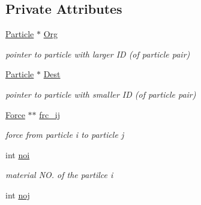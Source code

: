 \subsection*{Private Attributes}
\begin{CompactItemize}
\item 
\hypertarget{classInteraction_b68efe982297a5b6e71ec85e37a60bfb}{
\hyperlink{classParticle}{Particle} $\ast$ \hyperlink{classInteraction_b68efe982297a5b6e71ec85e37a60bfb}{Org}}
\label{classInteraction_b68efe982297a5b6e71ec85e37a60bfb}

\begin{CompactList}\small\item\em pointer to particle with larger ID (of particle pair) \item\end{CompactList}\item 
\hypertarget{classInteraction_61023db08855158f1d188044251a412d}{
\hyperlink{classParticle}{Particle} $\ast$ \hyperlink{classInteraction_61023db08855158f1d188044251a412d}{Dest}}
\label{classInteraction_61023db08855158f1d188044251a412d}

\begin{CompactList}\small\item\em pointer to particle with smaller ID (of particle pair) \item\end{CompactList}\item 
\hypertarget{classInteraction_d9eed70414bdb5e371b096a7671c7a20}{
\hyperlink{classForce}{Force} $\ast$$\ast$ \hyperlink{classInteraction_d9eed70414bdb5e371b096a7671c7a20}{frc\_\-ij}}
\label{classInteraction_d9eed70414bdb5e371b096a7671c7a20}

\begin{CompactList}\small\item\em force from particle i to particle j \item\end{CompactList}\item 
\hypertarget{classInteraction_3e9360ca4d40c2e68bdf383fdd24ccce}{
int \hyperlink{classInteraction_3e9360ca4d40c2e68bdf383fdd24ccce}{noi}}
\label{classInteraction_3e9360ca4d40c2e68bdf383fdd24ccce}

\begin{CompactList}\small\item\em material NO. of the partilce i \item\end{CompactList}\item 
\hypertarget{classInteraction_0bad561d2bd56d468e48e1c2436978fc}{
int \hyperlink{classInteraction_0bad561d2bd56d468e48e1c2436978fc}{noj}}
\label{classInteraction_0bad561d2bd56d468e48e1c2436978fc}


\end{CompactItemize}
